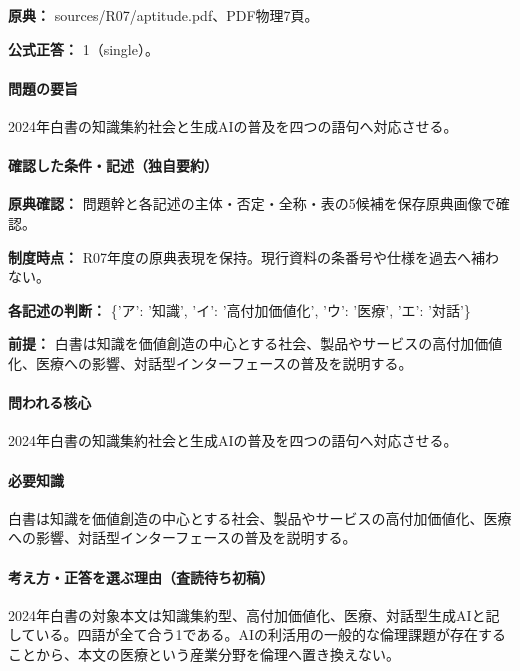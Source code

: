 \noindent\textbf{原典：} sources/R07/aptitude.pdf、PDF物理7頁。

\textbf{公式正答：} 1（single）。

\paragraph{問題の要旨} 2024年白書の知識集約社会と生成AIの普及を四つの語句へ対応させる。

\paragraph{確認した条件・記述（独自要約）}\mbox{}\par

\noindent\textbf{原典確認：} 問題幹と各記述の主体・否定・全称・表の5候補を保存原典画像で確認。\par

\noindent\textbf{制度時点：} R07年度の原典表現を保持。現行資料の条番号や仕様を過去へ補わない。\par

\noindent\textbf{各記述の判断：} \{'ア': '知識', 'イ': '高付加価値化', 'ウ': '医療', 'エ': '対話'\}\par

\noindent\textbf{前提：} 白書は知識を価値創造の中心とする社会、製品やサービスの高付加価値化、医療への影響、対話型インターフェースの普及を説明する。\par

\paragraph{問われる核心} 2024年白書の知識集約社会と生成AIの普及を四つの語句へ対応させる。

\paragraph{必要知識} 白書は知識を価値創造の中心とする社会、製品やサービスの高付加価値化、医療への影響、対話型インターフェースの普及を説明する。

\paragraph{考え方・正答を選ぶ理由（査読待ち初稿）} 2024年白書の対象本文は知識集約型、高付加価値化、医療、対話型生成AIと記している。四語が全て合う1である。AIの利活用の一般的な倫理課題が存在することから、本文の医療という産業分野を倫理へ置き換えない。

